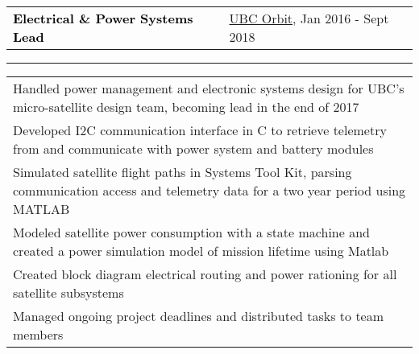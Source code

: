 \documentclass[10pt,letterpaper]{article}
\newcommand{\mpwidth}{\linewidth-\fboxsep-\fboxsep}
\newcommand{\tzlarrow}{(0,0) -- (0.2,0) -- (0.3,0.2) -- (0.2,0.4) -- (0,0.4) -- (0.1,0.2) -- cycle;}
\newcommand{\larrow}[1]
{\begin{tikzpicture}[scale=0.58]
	 \filldraw[fill=#1!100,draw=#1!100!black]  \tzlarrow
 \end{tikzpicture}
}
\newcommand{\cvsection}[1]
{
\colorbox{sectcol}{\mystrut \makebox[1\mpwidth][l]{
\textcolor{white}{\uppercase{#1}}}}\\
}
\newcommand{\cvbigevent}[9]
{
\vspace{8pt}
	\begin{tabular*}{0.2\mpwidth}{p{0.4\mpwidth}  x{0.575\mpwidth}}
 	\textcolor{black}{\textbf{#2}} & \textcolor{complcol}{#3}, \textcolor{bgcol}{#1} 

	\end{tabular*}
\vspace{-12pt}
\textcolor{softcol}{\hrule}
\vspace{6pt}
	\begin{tabular*}{0.5\mpwidth}{p{\mpwidth}}
\larrow{softcol}  #4\\[6pt]
\larrow{softcol}  #5\\[6pt]
\larrow{softcol}  #6\\[6pt]
\larrow{softcol}  #7\\[6pt]
\larrow{softcol}  #8\\[6pt]
\larrow{softcol}  #9\\[6pt]
	\end{tabular*}

}
\newcommand{\mystrut}{\rule[-.3\baselineskip]{0pt}{\baselineskip}}
\begin{document}
{\begin{minipage}[c][0.95\textheight][t]{0.69\linewidth}






\vspace{12pt}


\cvsection{Design Team}


\cvbigevent{Jan 2016 - Sept 2018}{Electrical \& Power Systems Lead}{\href{https://www.ubcorbit.com/}{UBC Orbit}}{Handled power management and electronic systems design for UBC's micro-satellite design team, becoming lead in the end of 2017}{Developed I2C communication interface in C to retrieve telemetry from and communicate with power system and battery modules}{Simulated satellite flight paths in Systems Tool Kit, parsing communication access and telemetry data for a two year period using MATLAB}{Modeled satellite power consumption with a state machine and created a power simulation model of mission lifetime using Matlab}{Created block diagram electrical routing and power rationing for all satellite subsystems}{Managed ongoing project deadlines and distributed tasks to team members}






\end{minipage}}%
\end{document}
